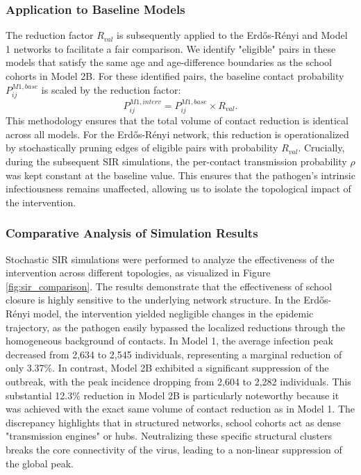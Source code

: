 \subsubsection{Application to Baseline Models}
The reduction factor $R_{val}$ is subsequently applied to the Erd\H{o}s-R\'enyi and Model 1 networks to facilitate a fair comparison.
We identify "eligible" pairs in these models that satisfy the same age and age-difference boundaries as the school cohorts in Model 2B.
For these identified pairs, the baseline contact probability $P_{ij}^{M1, base}$ is scaled by the reduction factor:
\begin{equation}
    P_{ij}^{M1, interv} = P_{ij}^{M1, base} \times R_{val}.
\end{equation}
This methodology ensures that the total volume of contact reduction is identical across all models.
For the Erd\H{o}s-R\'enyi network, this reduction is operationalized by stochastically pruning edges of eligible pairs with probability $R_{val}$.
Crucially, during the subsequent SIR simulations, the per-contact transmission probability $\rho$ was kept constant at the baseline value.
This ensures that the pathogen's intrinsic infectiousness remains unaffected, allowing us to isolate the topological impact of the intervention.

\subsubsection{Comparative Analysis of Simulation Results}
Stochastic SIR simulations were performed to analyze the effectiveness of the intervention across different topologies, as visualized in Figure \ref{fig:sir_comparison}.
The results demonstrate that the effectiveness of school closure is highly sensitive to the underlying network structure.
In the Erd\H{o}s-R\'enyi model, the intervention yielded negligible changes in the epidemic trajectory, as the pathogen easily bypassed the localized reductions through the homogeneous background of contacts.
In Model 1, the average infection peak decreased from 2,634 to 2,545 individuals, representing a marginal reduction of only 3.37\%.
In contrast, Model 2B exhibited a significant suppression of the outbreak, with the peak incidence dropping from 2,604 to 2,282 individuals.
This substantial 12.3\% reduction in Model 2B is particularly noteworthy because it was achieved with the exact same volume of contact reduction as in Model 1.
The discrepancy highlights that in structured networks, school cohorts act as dense "transmission engines" or hubs.
Neutralizing these specific structural clusters breaks the core connectivity of the virus, leading to a non-linear suppression of the global peak.

